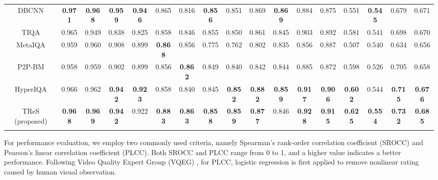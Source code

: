 \documentclass[10pt,twocolumn,letterpaper]{article}
\begin{document}
\begin{table*}[t!]
{\begin{tabular}{c||cc|cc|cc|cc||cc|cc|cc||cc}
DBCNN\cite{zhang2018blind} & \textbf{0.971} & \textbf{\textcolor{blue1}{0.968}} & \textbf{0.959} & \textbf{0.946} & 0.865 & 0.816 & \textbf{\textcolor{blue1}{0.856}} & 0.851 & 0.869 & \textbf{0.869} & 0.884 & 0.875 & 0.551 & \textbf{\textcolor{blue1}{0.545}} & 0.679 & 0.671\tabularnewline
TIQA\cite{you2020transformer} & 0.965 & 0.949 & 0.838 & 0.825 & 0.858 & 0.846 & 0.855 & 0.850 & 0.861 & 0.845 & 0.903 & 0.892 & 0.581 & 0.541 & 0.698 & 0.670 \tabularnewline
MetaIQA\cite{zhu2020metaiqa} & 0.959 & 0.960 & 0.908 & 0.899 & \textbf{\textcolor{blue1}{0.868}} & 0.856 & 0.775 & 0.762 & 0.802 & 0.835 & 0.856 & 0.887 & 0.507 & 0.540 & 0.634 & 0.656\tabularnewline
P2P-BM\cite{ying2019patches} & 0.958 & 0.959 & 0.902 & 0.899 & 0.856 & \textbf{\textcolor{blue1}{0.862}} & 0.849 & 0.840 & 0.842 & 0.844 & 0.885 & 0.872 & 0.598 & 0.526 & 0.705 & 0.658\tabularnewline
HyperIQA\cite{su2020blindly} & 0.966 & 0.962 & \textbf{\textcolor{blue1}{0.942}} & \textbf{\textcolor{blue1}{0.923}} & 0.858  & 0.840 & 0.845 & \textbf{\textcolor{blue1}{0.852}} & \textbf{0.882} & \textbf{\textcolor{blue1}{0.859}} & \textbf{\textcolor{blue1}{0.917}} & \textbf{\textcolor{blue1}{0.906}} & \textbf{\textcolor{blue1}{0.602}} & 0.544 & \textbf{\textcolor{blue1}{0.715}} & \textbf{\textcolor{blue1}{0.676}}\tabularnewline
TReS (proposed) & \textbf{\textcolor{blue1}{0.968}} & \textbf{0.969} & \textbf{\textcolor{blue1}{0.942}} & 0.922 & \textbf{0.883} & \textbf{0.863} & \textbf{0.858} & \textbf{0.859} & \textbf{\textcolor{blue1}{0.877}} & 0.846 & \textbf{0.928} & \textbf{0.915} & \textbf{0.625} & \textbf{0.554} & \textbf{0.732} & \textbf{0.685}\tabularnewline
\hline 
\hline 
\multicolumn{1}{c}{} &  & \multicolumn{1}{c}{} &  & \multicolumn{1}{c}{} &  & \multicolumn{1}{c}{} &  & \multicolumn{1}{c}{} &  & \multicolumn{1}{c}{} &  & \multicolumn{1}{c}{} &  & \multicolumn{1}{c}{} &  & \tabularnewline
\end{tabular}


}
\label{TB1}
\end{table*}



For performance evaluation, we employ two commonly used criteria, namely Spearman's rank-order correlation coefficient (SROCC) and Pearson's linear correlation coefficient (PLCC). 
Both SROCC and PLCC range from 0 to 1, and a higher value indicates a better performance.
Following Video Quality Expert Group (VQEG) \cite{antkowiak2000final}, for PLCC, logistic regression is first applied to remove nonlinear rating caused by human visual observation.
\end{document}
